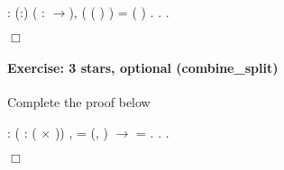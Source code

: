 \documentclass[12pt]{report}
\begin{document}
\begin{coqdoccode}
\coqdocnoindent
{}  : \coqdockw{\ensuremath{\forall}} (:)     ( : \ensuremath{\rightarrow}),\coqdoceol
\coqdocindent{1.00em}
( (   )  )  = (   ) .\coqdoceol
\coqdocnoindent
{}.\coqdoceol
 .\coqdoceol
\end{coqdoccode}
\ensuremath{\Box} 

\paragraph{Exercise: 3 stars, optional (combine\_split)}

 Complete the proof below \begin{coqdoccode}
\coqdocemptyline
\coqdocnoindent
{}  : \coqdockw{\ensuremath{\forall}}   ( :  ( \ensuremath{\times} ))  ,\coqdoceol
\coqdocindent{1.00em}
  = (, ) \ensuremath{\rightarrow}\coqdoceol
\coqdocindent{1.00em}
   = .\coqdoceol
\coqdocnoindent
{}.\coqdoceol
 .\coqdoceol
\end{coqdoccode}
\ensuremath{\Box} 
\end{document}

